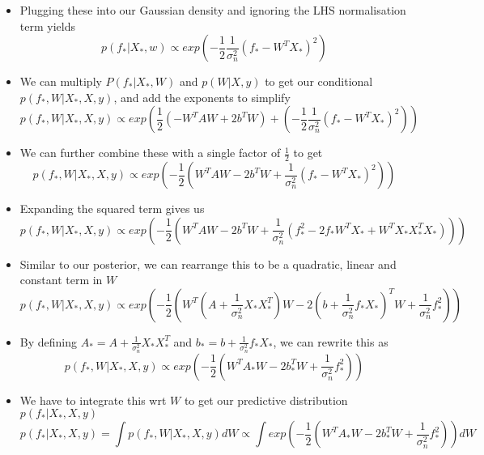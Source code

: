 \documentclass[12pt]{article}
\begin{document}
\begin{itemize}
\begin{equation}
\end{equation}
    \item Plugging these into our Gaussian density and ignoring the LHS normalisation term yields
\begin{equation}
    p(f_*|X_*,w) \propto exp\left(-\frac{1}{2}\frac{1}{\sigma^2_n}(f_* - W^TX_*)^2\right)
\end{equation}
    \item We can multiply $P(f_*|X_*,W)$ and $p(W|X,y)$ to get our conditional $p(f_*, W|X_*,X,y)$, and add the exponents to simplify
\begin{equation}
    p(f_*,W|X_*,X,y) \propto exp\left(\frac{1}{2}(-W^TAW + 2b^TW) + \left(-\frac{1}{2}\frac{1}{\sigma^2_n}(f_* - W^TX_*)^2\right)\right)
\end{equation}
    \item We can further combine these with a single factor of $\frac{1}{2}$ to get
\begin{equation}
    p(f_*,W|X_*,X,y) \propto exp\left(-\frac{1}{2}\left(W^TAW - 2b^TW + \frac{1}{\sigma^2_n}(f_* - W^TX_*)^2\right)\right)
\end{equation}
    \item Expanding the squared term gives us
\begin{equation}
    p(f_*,W|X_*,X,y) \propto exp\left(-\frac{1}{2}\left(W^TAW - 2b^TW + \frac{1}{\sigma^2_n}(f_*^2 - 2f_*W^TX_* + W^TX_*X_*^TX_*)\right)\right)
\end{equation}
    \item Similar to our posterior, we can rearrange this to be a quadratic, linear and constant term in $W$
\begin{equation}
    p(f_*,W|X_*,X,y) \propto exp\left(-\frac{1}{2}\left(W^T\left(A + \frac{1}{\sigma^2_n}X_*X_*^T\right)W - 2\left(b + \frac{1}{\sigma^2_n}f_*X_*\right)^TW + \frac{1}{\sigma_n^2}f_*^2\right)\right)
\end{equation}
    \item By defining $A_* = A + \frac{1}{\sigma^2_n}X_*X_*^T$ and $b_* = b + \frac{1}{\sigma^2_n}f_*X_*$, we can rewrite this as
\begin{equation}
    p(f_*,W|X_*,X,y) \propto exp\left(-\frac{1}{2}\left(W^TA_*W - 2b_*^TW + \frac{1}{\sigma_n^2}f_*^2\right)\right)
\end{equation}
    \item We have to integrate this wrt $W$ to get our predictive distribution $p(f_*|X_*,X,y)$
\begin{equation}
    p(f_*|X_*,X,y) = \int p(f_*,W|X_*,X,y)dW \propto \int exp\left(-\frac{1}{2}\left(W^TA_*W - 2b_*^TW + \frac{1}{\sigma_n^2}f_*^2\right)\right)dW

\end{equation}
\end{itemize}
\end{document}

